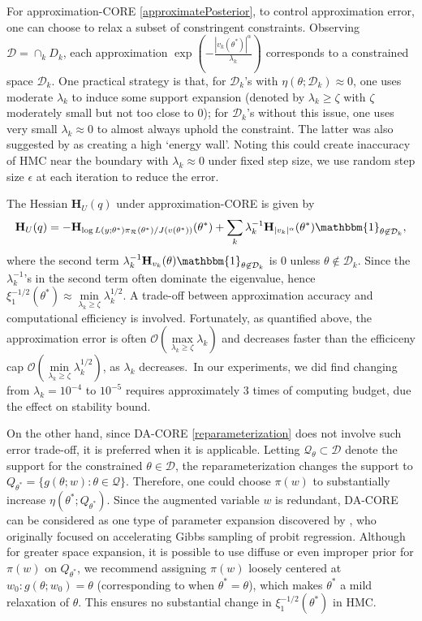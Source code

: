 \documentclass[10pt,fleqn]{article}
\newcommand{\mc}[1]{\mathcal{#1}}
\DeclareMathOperator{\1}{\mathbbm{1}}
\newcommand{\hess}{\mathbf{H}} %
\begin{document}
For approximation-CORE \eqref{approximatePosterior}, to control approximation
error, one can choose to relax a subset of constringent constraints. Observing  $\mc D=\cap_{k} D_k$,
each approximation $\exp(-\frac{|v_k(\theta^*)|^\alpha}{\lambda_k})$ corresponds to a constrained space $\mc D_k$.  One practical strategy is that, for $\mc D_k$'s with $\eta(\theta;\mc D_k)\approx 0$, one uses moderate $\lambda_k$ to induce some support expansion (denoted by $\lambda_k\ge \zeta$ with $\zeta$ moderately small but not too close to $0$);  for $\mc D_k$'s without this issue, one uses very small $\lambda_k\approx 0$ to almost always uphold the constraint.
The latter was also suggested by \cite{neal2011mcmc} as creating a high `energy wall'. Noting this could create  inaccuracy of HMC near the boundary with $\lambda_k\approx 0$ under fixed step size,  we use random step size $\epsilon$ at each iteration to reduce the error.


The Hessian $\hess_U(q)$ under approximation-CORE is given by
\begin{equation}
\label{eq:hessian_extrinsic}
\hess_U(q) = -\hess_{\log L(y;\theta^*) \pi_{\mc
R}(\theta^*) /J(v(\theta^*)) }(\theta^*)+\sum_k \lambda_k^{-1} \hess_{|v_k|^\alpha}(\theta^*) \mathbbm{1}_{\theta\not\in \mc D_k},
\end{equation}
where the second term $\lambda_k^{-1} \hess_{v_k}(\theta) \mathbbm{1}_{\theta\not\in \mc D_k}$ is $0$ unless $\theta\not\in \mc D_k$. Since the $\lambda^{-1}_k$'s
in the second term often dominate the eigenvalue, hence $\xi^{-1/2}_1(\theta^*)\approx
\underset{\lambda_k\ge \zeta}{\min}\lambda_k^{1/2}$. A trade-off between approximation accuracy and computational efficiency is involved. Fortunately, as quantified above, the approximation error is often $\mc O( \underset{\lambda_k\ge \zeta}{\max}\lambda_k)
$ and decreases faster than the efficiceny cap $\mc O( \underset{\lambda_k\ge \zeta}{\min}\lambda_k^{1/2})$, as $\lambda_k$ decreases.\ In our experiments, we did find changing from $\lambda_{k}=10^{-4}$ to $10^{-5}$ requires approximately $3$ times of computing budget, due the effect on stability
bound.


On the other hand, since DA-CORE \eqref{reparameterization} does not involve such error trade-off, it is preferred when it is applicable. Letting $\mc Q_\theta\subset \mc D$ denote the support for the constrained $\theta\in \mc D$, the reparameterization changes the support to $Q_{\theta^*}=\{g(\theta;w):\theta\in \mc Q\}$. Therefore, one could choose $\pi(w)$ to substantially increase $\eta(\theta^*; Q_{\theta^*})$.
Since the augmented variable $w$ is redundant, DA-CORE can
be considered as one type of parameter expansion  discovered by \cite{liu1999parameter}, who originally
focused on accelerating  Gibbs sampling of probit regression. 
Although for
greater space expansion,  it is possible to use diffuse or even improper prior for $\pi(w)$ on $Q_{\theta^*}$,
 we recommend assigning $\pi(w)$ loosely centered at $w_0:g(\theta;w_0)=\theta$ (corresponding to when $\theta^*=\theta$), which makes $\theta^*$ a mild relaxation of $\theta$. This ensures no substantial change in $\xi^{-1/2}_1(\theta^*)$ in HMC.
\end{document}
